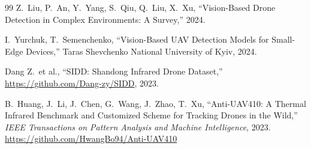 \documentclass[12pt,a4paper]{report}
\begin{document}
\begin{thebibliography}{99}
Z.\ Liu, P.\ An, Y.\ Yang, S.\ Qiu, Q.\ Liu, X.\ Xu,
``Vision-Based Drone Detection in Complex Environments: A Survey,''
2024.

I.\ Yurchuk, T.\ Semenchenko,
``Vision-Based {UAV} Detection Models for Small-Edge Devices,''
Taras Shevchenko National University of Kyiv, 2024.

Dang Z.\ et al.,
``SIDD: Shandong Infrared Drone Dataset,''
\url{https://github.com/Dang-zy/SIDD}, 2023.

B.\ Huang, J.\ Li, J.\ Chen, G.\ Wang, J.\ Zhao, T.\ Xu,
``Anti-UAV410: A Thermal Infrared Benchmark and Customized Scheme
for Tracking Drones in the Wild,''
\textit{IEEE Transactions on Pattern Analysis and Machine Intelligence},
2023.
\url{https://github.com/HwangBo94/Anti-UAV410}

\end{thebibliography}
\end{document}
